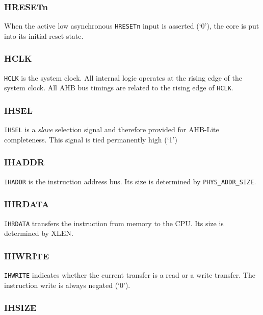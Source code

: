 \subsubsection{HRESETn}\label{hresetn}

When the active low asynchronous \texttt{HRESETn} input is asserted (`0'), the
core is put into its initial reset state.

\subsubsection{HCLK}\label{hclk}

\texttt{HCLK} is the system clock. All internal logic operates at the rising edge
of the system clock. All AHB bus timings are related to the rising edge
of \texttt{HCLK}.

\subsubsection{IHSEL}\label{ihsel}

\texttt{IHSEL} is a \emph{slave} selection signal and therefore provided for
AHB-Lite completeness. This signal is tied permanently high (`1')

\subsubsection{IHADDR}\label{ihaddr}

\texttt{IHADDR} is the instruction address bus. Its size is determined by
\texttt{PHYS\_ADDR\_SIZE}.

\subsubsection{IHRDATA}\label{ihrdata}

\texttt{IHRDATA} transfers the instruction from memory to the CPU. Its size is
determined by XLEN.
\texttt{
}\subsubsection{IHWRITE}\label{ihwrite}

\texttt{IHWRITE} indicates whether the current transfer is a read or a write
transfer. The instruction write is always negated (`0').

\subsubsection{IHSIZE}\label{ihsize}

